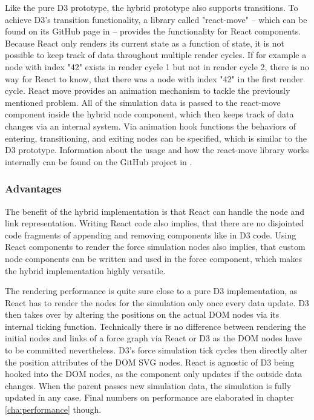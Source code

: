 Like the pure D3 prototype, the hybrid prototype also supports transitions. To achieve D3's transition functionality, a library called "react-move" -- which can be found on its GitHub page in \cite{ReactMove} -- provides the functionality for React components. Because React only renders its current state as a function of state, it is not possible to keep track of data throughout multiple render cycles. If for example a node with index "42" exists in render cycle 1 but not in render cycle 2, there is no way for React to know, that there was a node with index "42" in the first render cycle. React move provides an animation mechanism to tackle the previously mentioned problem. All of the simulation data is passed to the react-move component inside the hybrid node component, which then keeps track of data changes via an internal system. Via animation hook functions the behaviors of entering, transitioning, and exiting nodes can be specified, which is similar to the D3 prototype. Information about the usage and how the react-move library works internally can be found on the GitHub project in \cite{ReactMove}.


\subsubsection{Advantages}

The benefit of the hybrid implementation is that React can handle the node and link representation. Writing React code also implies, that there are no disjointed code fragments of appending and removing components like in D3 code. Using React components to render the force simulation nodes also implies, that custom node components can be written and used in the force component, which makes the hybrid implementation highly versatile.

The rendering performance is quite sure close to a pure D3 implementation, as React has to render the nodes for the simulation only once every data update. D3 then takes over by altering the positions on the actual DOM nodes via its internal ticking function. Technically there is no difference between rendering the initial nodes and links of a force graph via React or D3 as the DOM nodes have to be committed nevertheless. D3's force simulation tick cycles then directly alter the position attributes of the DOM SVG nodes. React is agnostic of D3 being hooked into the DOM nodes, as the component only updates if the outside data changes. When the parent passes new simulation data, the simulation is fully updated in any case. Final numbers on performance are elaborated in chapter \ref{cha:performance} though.

